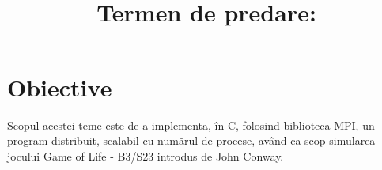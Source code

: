 \documentclass{article}
\title{
\textmd{\textbf{\MNClass \\ \MNTitle}}\\
\normalsize\vspace{0.1in}\small{Termen de predare: \MNDueDate}\\
}
\date{} %
\begin{document}
\maketitle





\section{Obiective}

Scopul acestei teme este de a implementa, în C, folosind biblioteca MPI, un program distribuit, scalabil cu numărul de procese, având ca scop simularea jocului Game of Life - B3/S23 introdus de John Conway.


\end{document}
